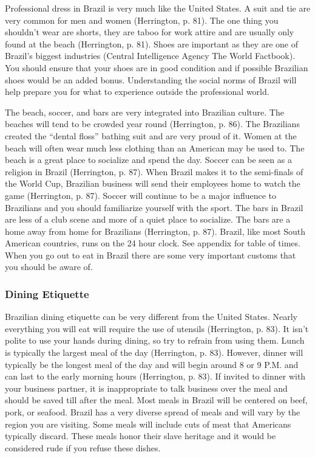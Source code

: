 \documentclass[11pt,a4paper,oneside]{report}
\begin{document}
Professional dress in Brazil is very much like the United States. A suit and
tie are very common for men and women (Herrington, p. 81). The one thing you
shouldn’t wear are shorts, they are taboo for work attire and are usually only
found at the beach (Herrington, p. 81). Shoes are important as they are one of
Brazil’s biggest industries (Central Intelligence Agency The World Factbook).
You should ensure that your shoes are in good condition and if possible
Brazilian shoes would be an added bonus. Understanding the social norms of
Brazil will help prepare you for what to experience outside the professional
world.

The beach, soccer, and bars are very integrated into Brazilian culture. The
beaches will tend to be crowded year round (Herrington, p. 86). The Brazilians
created the “dental floss” bathing suit and are very proud of it. Women at the
beach will often wear much less clothing than an American may be used to. The
beach is a great place to socialize and spend the day.  Soccer can be seen as a
religion in Brazil (Herrington, p. 87). When Brazil makes it to the semi-finals
of the World Cup, Brazilian business will send their employees home to watch
the game (Herrington, p. 87). Soccer will continue to be a major influence to
Brazilians and you should familiarize yourself with the sport. The bars in
Brazil are less of a club scene and more of a quiet place to socialize. The
bars are a home away from home for Brazilians (Herrington, p. 87). Brazil, like
most South American countries, runs on the 24 hour clock. See appendix for
table of times.  When you go out to eat in Brazil there are some very important
customs that you should be aware of.

\subsubsection{Dining Etiquette}
Brazilian dining etiquette can be very different from the United States.
Nearly everything you will eat will require the use of utensils
(Herrington, p. 83). It isn’t polite to use your hands during dining, so
try to refrain from using them. Lunch is typically the largest meal of the
day (Herrington, p. 83). However, dinner will typically be the longest meal
of the day and will begin around 8 or 9 P.M. and can last to the early
morning hours (Herrington, p. 83). If invited to dinner with your business
partner, it is inappropriate to talk business over the meal and should be
saved till after the meal. Most meals in Brazil will be centered on beef,
pork, or seafood. Brazil has a very diverse spread of meals and will vary
by the region you are visiting. Some meals will include cuts of meat that
Americans typically discard. These meals honor their slave heritage and it
would be considered rude if you refuse these dishes.
\end{document}
